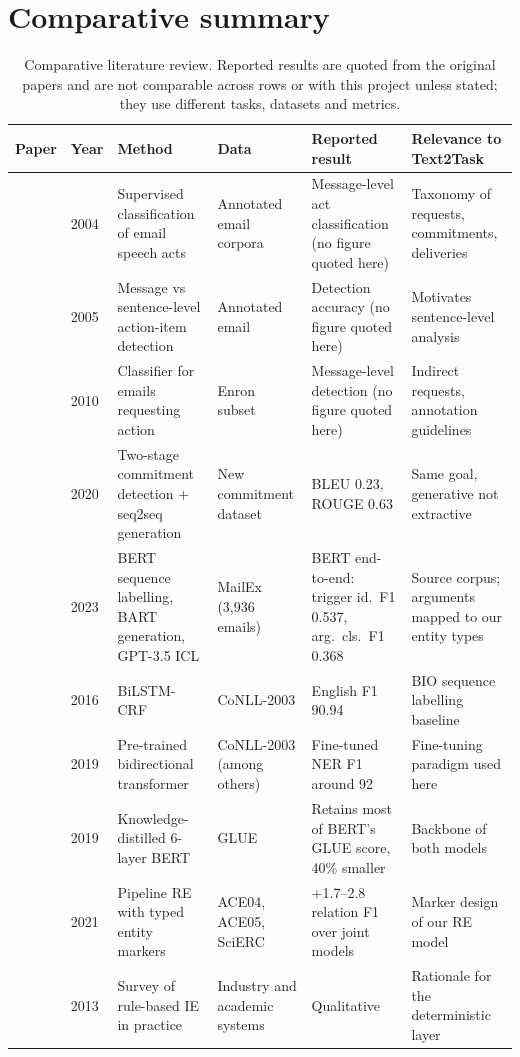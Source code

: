\section{Comparative summary}
\label{sec:litcompare}
\begin{table}[t]
\centering
\caption[Comparative literature review]{Comparative literature review. Reported results are quoted from the original papers and are not comparable across rows or with this project unless stated; they use different tasks, datasets and metrics.}
\label{tab:literature}
\footnotesize
\begin{tabularx}{\linewidth}{@{}p{24mm}p{8mm}LLp{25mm}L@{}}
\toprule
Paper & Year & Method & Data & Reported result & Relevance to Text2Task \\
\midrule
\citet{cohen2004speechacts} & 2004 & Supervised classification of email speech acts & Annotated email corpora & Message-level act classification (no figure quoted here) & Taxonomy of requests, commitments, deliveries \\
\citet{bennett2005actionitems} & 2005 & Message vs sentence-level action-item detection & Annotated email & Detection accuracy (no figure quoted here) & Motivates sentence-level analysis \\
\citet{lampert2010requests} & 2010 & Classifier for emails requesting action & Enron subset & Message-level detection (no figure quoted here) & Indirect requests, annotation guidelines \\
\citet{mukherjee2020smarttodo} & 2020 & Two-stage commitment detection + seq2seq generation & New commitment dataset & BLEU 0.23, ROUGE 0.63 & Same goal, generative not extractive \\
\citet{srivastava2023mailex} & 2023 & BERT sequence labelling, BART generation, GPT-3.5 ICL & MailEx (3,936 emails) & BERT end-to-end: trigger id.\ F1 0.537, arg.\ cls.\ F1 0.368 & Source corpus; arguments mapped to our entity types \\
\citet{lample2016ner} & 2016 & BiLSTM-CRF & CoNLL-2003 & English F1 90.94 & BIO sequence labelling baseline \\
\citet{devlin2019bert} & 2019 & Pre-trained bidirectional transformer & CoNLL-2003 (among others) & Fine-tuned NER F1 around 92 & Fine-tuning paradigm used here \\
\citet{sanh2019distilbert} & 2019 & Knowledge-distilled 6-layer BERT & GLUE & Retains most of BERT's GLUE score, 40\% smaller & Backbone of both models \\
\citet{zhong2021pure} & 2021 & Pipeline RE with typed entity markers & ACE04, ACE05, SciERC & +1.7--2.8 relation F1 over joint models & Marker design of our RE model \\
\citet{chiticariu2013rules} & 2013 & Survey of rule-based IE in practice & Industry and academic systems & Qualitative & Rationale for the deterministic layer \\
\bottomrule
\end{tabularx}
\end{table}

